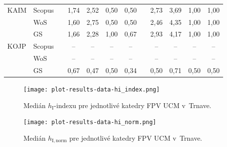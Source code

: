 \begin{table}
\begin{tabularx}{\textwidth}{XXp{1ex}ccccp{1ex}cccc}
    KAIM & Scopus & & 1,74  & 2,52 & 0,50 & 0,50 & & 2,73  & 3,69 & 1,00 & 1,00 \\
         & WoS    & & 1,60  & 2,75 & 0,50 & 0,50 & & 2,46  & 4,35 & 1,00 & 1,00 \\
         & GS     & & 1,66  & 2,28 & 1,00 & 0,67 & & 2,93  & 4,17 & 1,00 & 1,00 \\[1ex]
    KOJP & Scopus & & --    & --   & --   & --   & & --    & --   & --   & --   \\
         & WoS    & & --    & --   & --   & --   & & --    & --   & --   & --   \\
         & GS     & & 0,67  & 0,47 & 0,50 & 0,34 & & 0,50  & 0,71 & 0,50 & 0,50 \\
    \bottomrule
  \end{tabularx}
\end{table}

\begin{figure}
  \centering
  \texttt{[image: plot-results-data-hi\_index.png]}
  \caption[Medián $h_{\mathrm{I}}$-indexu pre jednotlivé katedry FPV UCM v~Trnave.]
  {Medián $h_{\mathrm{I}}$-indexu pre jednotlivé katedry FPV UCM v~Trnave.}
  \label{fig:hi-index.plot}
\end{figure}

\begin{figure}
  \centering
  \texttt{[image: plot-results-data-hi\_norm.png]}
  \caption[Medián $h_{\mathrm{I,norm}}$ pre jednotlivé katedry FPV UCM v~Trnave.]%
  {Medián $h_{\mathrm{I,norm}}$ pre jednotlivé katedry FPV UCM v~Trnave.}
  \label{fig:hinorm.plot}
\end{figure}

